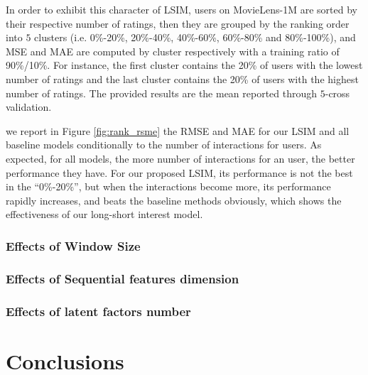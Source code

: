 \documentclass{sig-alternate-05-2015}
\begin{document}
In order to exhibit this character of LSIM,
users on MovieLens-1M are sorted by their respective number of ratings, then
they are grouped by the ranking order into $5$ clusters (i.e. 0\%-20\%,
20\%-40\%, 40\%-60\%, 60\%-80\% and 80\%-100\%), and MSE and MAE are computed
by cluster respectively with a training ratio of 90\%/10\%.
For instance, the first cluster contains the 20\% of users with the lowest
number of ratings and the last cluster contains the 20\% of users with the
highest number of ratings.
The provided results are the mean reported through $5$-cross validation.

we report in Figure \ref{fig:rank_rsme} the RMSE and MAE for our LSIM and all baseline
models conditionally to the number of interactions for users.
As expected, for all models, the more number of interactions for an user, the better
performance they have. For our proposed LSIM, its performance is not the best in the
``0\%-20\%'', but when the interactions become more, its performance rapidly increases,
and beats the baseline methods obviously, which shows the effectiveness of our
long-short interest model. 

\subsubsection{Effects of Window Size}


\subsubsection{Effects of Sequential features dimension}


\subsubsection{Effects of latent factors number}


\section{Conclusions}





\end{document}
